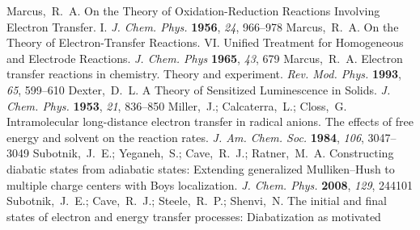 \begin{mcitethebibliography}{27}
Marcus,~R.~A. On the Theory of Oxidation-Reduction Reactions Involving Electron
  Transfer. I. \emph{J. Chem. Phys.} \textbf{1956}, \emph{24},
  966--978\relax
\mciteBstWouldAddEndPuncttrue
\mciteSetBstMidEndSepPunct{\mcitedefaultmidpunct}
{\mcitedefaultendpunct}{\mcitedefaultseppunct}\relax
\EndOfBibitem
{}
Marcus,~R.~A. On the Theory of Electron-Transfer Reactions. VI. Unified
  Treatment for Homogeneous and Electrode Reactions. \emph{J. Chem. Phys} \textbf{1965}, \emph{43}, 679\relax
\mciteBstWouldAddEndPuncttrue
\mciteSetBstMidEndSepPunct{\mcitedefaultmidpunct}
{\mcitedefaultendpunct}{\mcitedefaultseppunct}\relax
\EndOfBibitem
{}
Marcus,~R.~A. Electron transfer reactions in chemistry. Theory and experiment.
  \emph{Rev. Mod.  Phys.} \textbf{1993}, \emph{65}, 599--610\relax
\mciteBstWouldAddEndPuncttrue
\mciteSetBstMidEndSepPunct{\mcitedefaultmidpunct}
{\mcitedefaultendpunct}{\mcitedefaultseppunct}\relax
\EndOfBibitem
{}
Dexter,~D.~L. A Theory of Sensitized Luminescence in Solids. \emph{J. Chem. Phys.} \textbf{1953}, \emph{21}, 836--850\relax
\mciteBstWouldAddEndPuncttrue
\mciteSetBstMidEndSepPunct{\mcitedefaultmidpunct}
{\mcitedefaultendpunct}{\mcitedefaultseppunct}\relax
\EndOfBibitem
{}
Miller,~J.; Calcaterra,~L.; Closs,~G. Intramolecular long-distance electron
  transfer in radical anions. The effects of free energy and solvent on the
  reaction rates. \emph{J.  Am.  Chem.  Soc.}
  \textbf{1984}, \emph{106}, 3047--3049\relax
\mciteBstWouldAddEndPuncttrue
\mciteSetBstMidEndSepPunct{\mcitedefaultmidpunct}
{\mcitedefaultendpunct}{\mcitedefaultseppunct}\relax
\EndOfBibitem
{}
Subotnik,~J.~E.; Yeganeh,~S.; Cave,~R.~J.; Ratner,~M.~A. Constructing diabatic
  states from adiabatic states: Extending generalized Mulliken--Hush to
  multiple charge centers with Boys localization. \emph{J. Chem. Phys.} \textbf{2008}, \emph{129}, 244101\relax
\mciteBstWouldAddEndPuncttrue
\mciteSetBstMidEndSepPunct{\mcitedefaultmidpunct}
{\mcitedefaultendpunct}{\mcitedefaultseppunct}\relax
\EndOfBibitem
{}
Subotnik,~J.~E.; Cave,~R.~J.; Steele,~R.~P.; Shenvi,~N. The initial and final
  states of electron and energy transfer processes: Diabatization as motivated

\end{mcitethebibliography}
